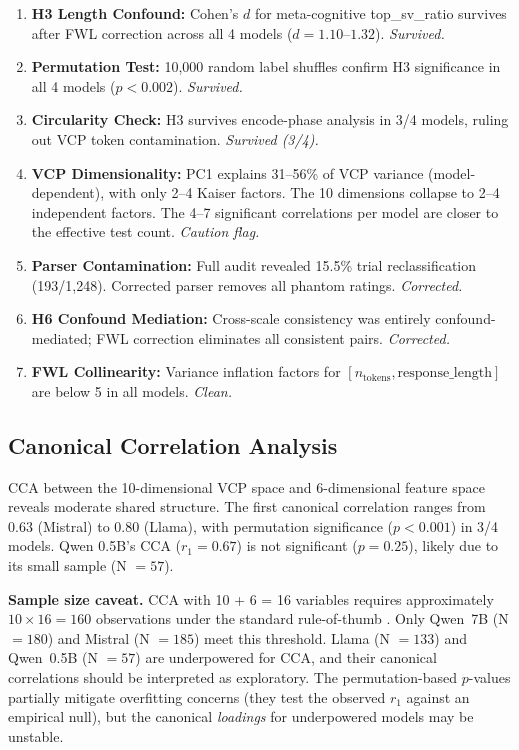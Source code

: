 \documentclass[11pt,a4paper]{article}
\begin{document}
\begin{enumerate}
    \item \textbf{H3 Length Confound:} Cohen's $d$ for meta-cognitive top\_sv\_ratio survives after FWL correction across all 4 models ($d = 1.10$--$1.32$). \textit{Survived.}
    \item \textbf{Permutation Test:} 10,000 random label shuffles confirm H3 significance in all 4 models ($p < 0.002$). \textit{Survived.}
    \item \textbf{Circularity Check:} H3 survives encode-phase analysis in 3/4 models, ruling out VCP token contamination. \textit{Survived (3/4).}
    \item \textbf{VCP Dimensionality:} PC1 explains 31--56\% of VCP variance (model-dependent), with only 2--4 Kaiser factors. The 10 dimensions collapse to 2--4 independent factors. The 4--7 significant correlations per model are closer to the effective test count. \textit{Caution flag.}
    \item \textbf{Parser Contamination:} Full audit revealed 15.5\% trial reclassification (193/1,248). Corrected parser removes all phantom ratings. \textit{Corrected.}
    \item \textbf{H6 Confound Mediation:} Cross-scale consistency was entirely confound-mediated; FWL correction eliminates all consistent pairs. \textit{Corrected.}
    \item \textbf{FWL Collinearity:} Variance inflation factors for $[n_{\text{tokens}}, \text{response\_length}]$ are below 5 in all models. \textit{Clean.}
\end{enumerate}

\subsection{Canonical Correlation Analysis}

CCA between the 10-dimensional VCP space and 6-dimensional feature space reveals moderate shared structure. The first canonical correlation ranges from 0.63 (Mistral) to 0.80 (Llama), with permutation significance ($p < 0.001$) in 3/4 models. Qwen 0.5B's CCA ($r_1 = 0.67$) is not significant ($p = 0.25$), likely due to its small sample (N $= 57$).

\textbf{Sample size caveat.} CCA with 10 + 6 = 16 variables requires approximately $10 \times 16 = 160$ observations under the standard rule-of-thumb \citep{varoquaux2018cross}. Only Qwen~7B (N $= 180$) and Mistral (N $= 185$) meet this threshold. Llama (N $= 133$) and Qwen~0.5B (N $= 57$) are underpowered for CCA, and their canonical correlations should be interpreted as exploratory. The permutation-based $p$-values partially mitigate overfitting concerns (they test the observed $r_1$ against an empirical null), but the canonical \emph{loadings} for underpowered models may be unstable.
\end{document}
